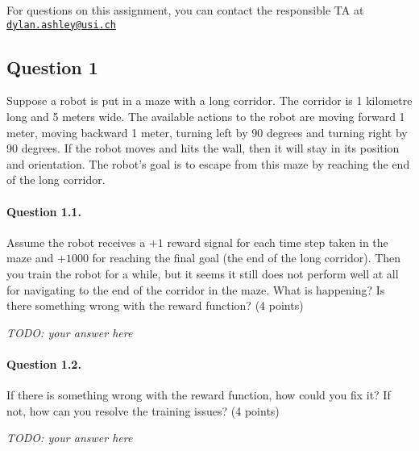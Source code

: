 \documentclass[a4paper,11pt]{article}
\begin{document}
\vspace{1em}\noindent For questions on this assignment, you can contact the responsible TA at \href{mailto:dylan.ashley@usi.ch}{\texttt{dylan.ashley@usi.ch}}

\clearpage

\subsection*{Question 1}
Suppose a robot is put in a maze with a long corridor.
The corridor is 1 kilometre long and 5 meters wide.
The available actions to the robot are moving forward 1 meter, moving backward 1 meter, turning left by 90 degrees and turning right by 90 degrees.
If the robot moves and hits the wall, then it will stay in its position and orientation.
The robot's goal is to escape from this maze by reaching the end of the long corridor.

\begin{minipage}{0.9\textwidth}
\vspace{.5cm}
\paragraph{Question 1.1.}
Assume the robot receives a $+1$ reward signal for each time step taken in the maze and $+1000$ for reaching the final goal (the end of the long corridor).
Then you train the robot for a while, but it seems it still does not perform well at all for navigating to the end of the corridor in the maze.
What is happening?
Is there something wrong with the reward function?
(4 points)
\vspace{.5cm}

\textit{TODO: your answer here}

\end{minipage}

\begin{minipage}{0.9\textwidth}
\vspace{.5cm}
\paragraph{Question 1.2.}
If there is something wrong with the reward function, how could you fix it? If not, how can you resolve the training issues?
(4 points)
\vspace{.5cm}

\textit{TODO: your answer here}

\end{minipage}
\end{document}
